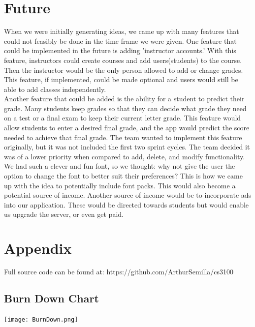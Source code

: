\documentclass[a4paper]{article} %
\begin{document}
\section{Future}
When we were initially generating ideas, we came up with many features that could not feasibly be done in the time frame we were given. One feature that could be implemented in the future is adding 'instructor accounts.'  With this feature, instructors could create courses and add users(students) to the course. Then the instructor would be the only person allowed to add or change grades. This feature, if implemented, could be made optional and users would still be able to add classes independently.
\\
Another feature that could be added is the ability for a student to predict their grade. Many students keep grades so that they can decide what grade they need on a test or a final exam to keep their current letter grade. This feature would allow students to enter a desired final grade, and the app would predict the score needed to achieve that final grade. The team wanted to implement this feature originally, but it was not included the first two sprint cycles. The team decided it was of a lower priority when compared to add, delete, and modify functionality.
\\
We had such a clever and fun font, so we thought: why not give the user the option to change the font to better suit their preferences? This is how we came up with the idea to potentially include font packs. This would also become a potential source of income. Another source of income would be to incorporate ads into our application. These would be directed towards students but would enable us upgrade the server, or even get paid.


\section{Appendix}

Full source code can be found at: https://github.com/ArthurSemilla/cs3100

\subsection{Burn Down Chart} \label{Burn}
\texttt{[image: BurnDown.png]}
\end{document}
